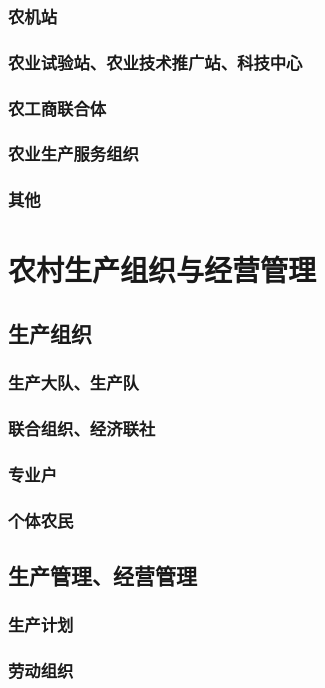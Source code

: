 \documentclass[UTF8]{../../RepresentationUniverse}
\begin{document}
    \subsubsection{农机站}
    \subsubsection{农业试验站、农业技术推广站、科技中心}
    \subsubsection{农工商联合体}
    \subsubsection{农业生产服务组织}
    \subsubsection{其他}

\section{农村生产组织与经营管理}
    \subsection{生产组织}
        \subsubsection{生产大队、生产队}
        \subsubsection{联合组织、经济联社}
        \subsubsection{专业户}
        \subsubsection{个体农民}
    \subsection{生产管理、经营管理}
        \subsubsection{生产计划}
        \subsubsection{劳动组织}
\end{document}

